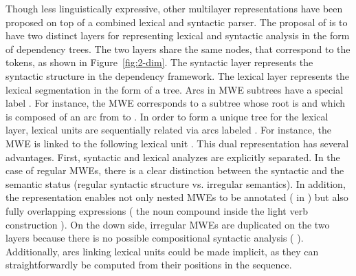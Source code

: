 \documentclass[output=paper]{LSP/langsci}
\begin{document}
Though less linguistically expressive, other multilayer representations have been proposed on top of a combined lexical and syntactic parser. The proposal of \citet{constant16} is to have two distinct layers for representing lexical and syntactic analysis in the form of dependency trees. The two layers share the same nodes, that correspond to the tokens, as shown in Figure~\ref{fig:2-dim}. 
The syntactic layer represents the syntactic structure in the dependency framework. The lexical layer represents the lexical segmentation in the form of a tree. 
Arcs in MWE subtrees have a special label . For instance, the MWE  corresponds to a subtree whose root is  and which is composed of an  arc from  to .  In order to form a unique tree for the lexical layer, lexical units are sequentially related via arcs labeled . For instance, the MWE  is linked to the following lexical unit . 
This dual representation has several advantages. First, syntactic and lexical analyzes are explicitly separated. In the case of regular MWEs, there is a clear distinction between the syntactic and the semantic status (regular syntactic structure vs. irregular semantics). In addition, the representation enables not only nested MWEs to be annotated (\eg{}   in ) but also fully overlapping expressions (\eg{} the noun compound  inside the light verb construction ). 
On the down side, irregular MWEs are duplicated on the two layers because there is no possible compositional syntactic analysis (\eg{} ). Additionally, arcs linking lexical units could be made implicit, as they can straightforwardly be computed from their positions in the sequence.
\end{document}
